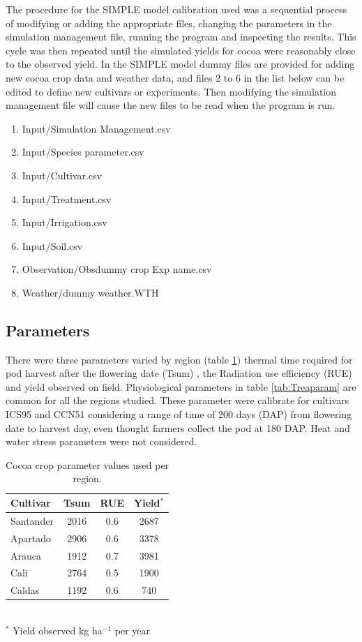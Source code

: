 \documentclass[gene,journal,article,submit,moreauthors,pdftex]{Definitions/mdpi}
\begin{document}
The procedure for the SIMPLE model \citep{Zao2019simple}calibration used was a sequential process of modifying or adding the appropriate files, changing the parameters in the simulation management file, running the program and inspecting the results. This cycle was then repeated until the  simulated yields for cocoa were reasonably close to the observed yield. In the SIMPLE model dummy files are provided for adding new cocoa crop data and weather data, and files 2 to 6 in the list below can be edited to define new cultivars or experiments. Then modifying the simulation management file will cause the new files to be read when the program is run.
\begin{enumerate}
	\item Input/Simulation Management.csv
	\item Input/Species parameter.csv
	\item Input/Cultivar.csv
    \item Input/Treatment.csv	
    \item Input/Irrigation.csv
    \item Input/Soil.csv
    \item Observation/Obsdummy crop Exp name.csv	
    \item Weather/dummy weather.WTH
\end{enumerate}

\subsection{Parameters}
There were three parameters varied by region (table \ref{tab:reparam}) thermal time required for pod harvest after the flowering date (Tsum) , the Radiation use efficiency (RUE) and yield observed on field. Physiological parameters in table \ref{tab:Treaparam} are  common  for all the regions studied. These parameter were calibrate for cultivars ICS95 and CCN51 considering a range of time of 200 days (DAP) from flowering date to harvest day, even thought farmers collect the pod at 180 DAP. Heat and water stress parameters were not considered.


\begin{table}[h!]	
	\caption {\footnotesize {Cocoa crop parameter values used per region.}}
	\label{tab:reparam} 
	\centering
	\begin{small}
		\begin{tabular}{l c c c }
			\hline
			{\bf Cultivar }&{\bf Tsum }&{\bf RUE}&{\bf Yield$^{*}$}\\
			\hline
			Santander & 2016 &0.6 & 2687 \\
			Apartado   & 2906 & 0.6 & 3378  \\
			Arauca   & 1912 & 0.7 & 3981  \\
			Cali   & 2764 & 0.5 & 1900  \\
			Caldas   & 1192 & 0.6 & 740  \\
			\hline
		\end{tabular} \\
		{\footnotesize $^{*}$ Yield observed kg ha$^{-1}$ per year} 
	\end{small}
\end{table}
\end{document}
